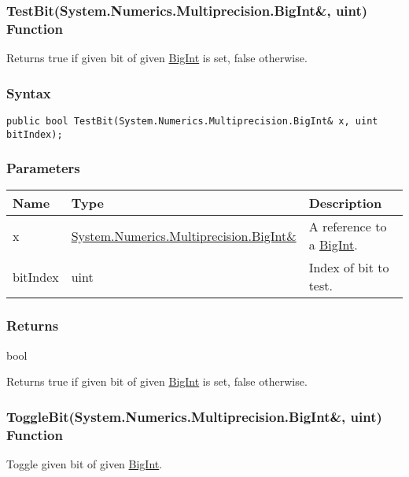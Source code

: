 \documentclass[a4paper,oneside,11.000000pt]{book}
\begin{document}
\hypertarget{System.Numerics.Multiprecision.TestBit.R.System.Numerics.Multiprecision.BigInt.uint}{\subsubsection*{TestBit(System.Numerics.Multiprecision.BigInt\&, uint) Function}}
\begin{flushleft}
Returns true if given bit of given \hyperlink{System.Numerics.Multiprecision.BigInt}{BigInt} is set, false otherwise.

\end{flushleft}
\subsubsection*{Syntax}
\texttt{public bool TestBit(System.Numerics.Multiprecision.BigInt\& x, uint bitIndex);}
\subsubsection*{Parameters}
\begin{flushleft}
\begin{supertabular}[l]{!{\raggedright}p{1.94573cm}!{\raggedright}p{7.92093cm}!{\raggedright}p{4.93333cm}}
\textbf{Name}
& \textbf{Type}
& \textbf{Description}
\\
\hline
x
& \hyperlink{System.Numerics.Multiprecision.BigInt}{System.\-Numerics.\-Multiprecision.\-BigInt\&\-}
& A reference to a \hyperlink{System.Numerics.Multiprecision.BigInt}{BigInt}.

\\
bitIndex
& uint
& Index of bit to test.

\\
\end{supertabular}

\end{flushleft}
\subsubsection*{Returns}bool
\begin{flushleft}
Returns true if given bit of given \hyperlink{System.Numerics.Multiprecision.BigInt}{BigInt} is set, false otherwise.

\end{flushleft}
\clearpage

\hypertarget{System.Numerics.Multiprecision.ToggleBit.R.System.Numerics.Multiprecision.BigInt.uint}{\subsubsection*{ToggleBit(System.Numerics.Multiprecision.BigInt\&, uint) Function}}
\begin{flushleft}
Toggle given bit of given \hyperlink{System.Numerics.Multiprecision.BigInt}{BigInt}.

\end{flushleft}
\end{document}
